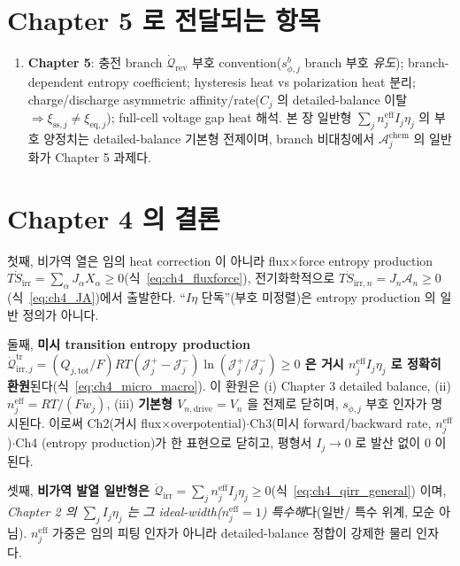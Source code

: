 \documentclass[11pt,a4paper]{article}
\newcommand{\eff}{\mathrm{eff}}
\newcommand{\eq}{\mathrm{eq}}
\newcommand{\drive}{\mathrm{drive}}
\newcommand{\tot}{\mathrm{tot}}
\newcommand{\irr}{\mathrm{irr}}
\newcommand{\rev}{\mathrm{rev}}
\newcommand{\tr}{\mathrm{tr}}
\newcommand{\chem}{\mathrm{chem}}
\newcommand{\sstat}{\mathrm{ss}}
\begin{document}
\section{Chapter 5 로 전달되는 항목}\label{sec:ch4_transmit}
\begin{enumerate}[label=\arabic*),leftmargin=2.0em]
\item \textbf{Chapter 5}: 충전 branch $\dot{\mathcal Q}_{\rev}$ 부호 convention($s_{\phi,j}^b$ branch 부호
  \emph{유도}); branch-dependent entropy coefficient; hysteresis heat vs polarization heat 분리;
  charge/discharge asymmetric affinity/rate($C_j$ 의 detailed-balance 이탈 $\Rightarrow\xi_{\sstat,j}\ne\xi_{\eq,j}$);
  full-cell voltage gap heat 해석. 본 장 일반형 $\sum_j n_j^{\eff}I_j\eta_j$ 의 부호 양정치는 detailed-balance
  기본형 전제이며, branch 비대칭에서 $\mathcal A_j^{\chem}$ 의 일반화가 Chapter 5 과제다.
\end{enumerate}

\section{Chapter 4 의 결론}\label{sec:ch4_concl}
첫째, 비가역 열은 임의 heat correction 이 아니라 flux$\times$force entropy production $T\dot S_\irr=\sum_\alpha
J_\alpha X_\alpha\ge0$(식~\eqref{eq:ch4_fluxforce}), 전기화학적으로 $T\dot S_{\irr,n}=J_n\mathcal A_n\ge0$
(식~\eqref{eq:ch4_JA})에서 출발한다. ``$I\eta$ 단독''(부호 미정렬)은 entropy production 의 일반 정의가 아니다.

둘째, \textbf{미시 transition entropy production $\dot{\mathcal Q}_{\irr,j}^{\tr}=(Q_{j,\tot}/F)RT(\mathcal J_j^+-\mathcal J_j^-)
\ln(\mathcal J_j^+/\mathcal J_j^-)\ge0$ 은 거시 $n_j^{\eff}I_j\eta_j$ 로 정확히 환원}된다(식~\eqref{eq:ch4_micro_macro}).
이 환원은 (i) Chapter 3 detailed balance, (ii) $n_j^{\eff}=RT/(Fw_j)$, (iii) \textbf{기본형 $V_{n,\drive}=V_n$}
을 전제로 닫히며, $s_{\phi,j}$ 부호 인자가 명시된다.
이로써 Ch2(거시 flux$\times$overpotential)$\cdot$Ch3(미시 forward/backward rate, $n_j^{\eff}$)$\cdot$Ch4
(entropy production)가 한 표현으로 닫히고, 평형서 $I_j\to0$ 로 발산 없이 0 이 된다.

셋째, \textbf{비가역 발열 일반형은 $\dot{\mathcal Q}_\irr=\sum_j n_j^{\eff}I_j\eta_j\ge0$}(식~\eqref{eq:ch4_qirr_general})
이며, \emph{Chapter 2 의 $\sum_j I_j\eta_j$ 는 그 ideal-width($n_j^{\eff}=1$) 특수해}다(일반/
특수 위계, 모순 아님). $n_j^{\eff}$ 가중은 임의 피팅 인자가 아니라 detailed-balance 정합이 강제한 물리 인자다.
\end{document}
